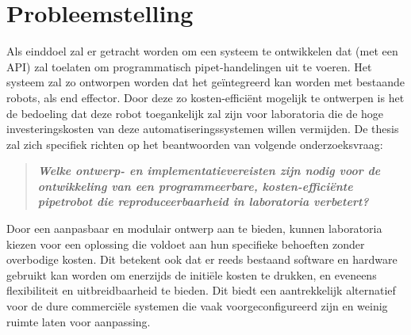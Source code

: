 \section{Probleemstelling}
Als einddoel zal er getracht worden om een systeem te ontwikkelen dat (met een API) zal toelaten om programmatisch pipet-handelingen uit te voeren. Het systeem zal zo ontworpen worden dat het geïntegreerd kan worden met bestaande robots, als end effector. Door deze zo kosten-efficiënt mogelijk te ontwerpen is het de bedoeling dat deze robot toegankelijk zal zijn voor laboratoria die de hoge investeringskosten van deze automatiseringssystemen willen vermijden. De thesis zal zich specifiek richten op het beantwoorden van volgende onderzoeksvraag:\begin{quote}
    \begin{center}
        \textbf{\textit{Welke ontwerp- en implementatievereisten zijn nodig voor de ontwikkeling van een programmeerbare, kosten-efficiënte pipetrobot die reproduceerbaarheid in laboratoria verbetert?}}
    \end{center}
\end{quote}
Door een aanpasbaar en modulair ontwerp aan te bieden, kunnen laboratoria kiezen voor een oplossing die voldoet aan hun specifieke behoeften zonder overbodige kosten. Dit betekent ook dat er reeds bestaand software en hardware gebruikt kan worden om enerzijds de initiële kosten te drukken, en eveneens flexibiliteit en uitbreidbaarheid te bieden. Dit biedt een aantrekkelijk alternatief voor de dure commerciële systemen die vaak voorgeconfigureerd zijn en weinig ruimte laten voor aanpassing.